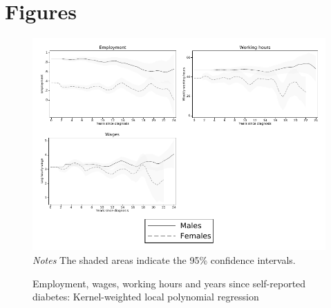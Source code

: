 \documentclass[12pt,english]{article}
\begin{document}
\setcounter{figure}{0}
\setcounter{page}{1}
\renewcommand{\thefigure}{\arabic{figure}}
\section*{Figures}


\begin{figure}[!ht]
	\caption{\label{fig:Kernel-weighted-local-polynomial_comb}Employment, wages, working hours and years since self-reported diabetes:  Kernel-weighted local polynomial regression}%
	\begin{center}
		\includegraphics[width=\linewidth]{figures/Figure1.pdf}\\
		\footnotesize{\textit{Notes} The shaded areas indicate the 95\% confidence intervals.}
	\end{center}
\end{figure}
\end{document}
